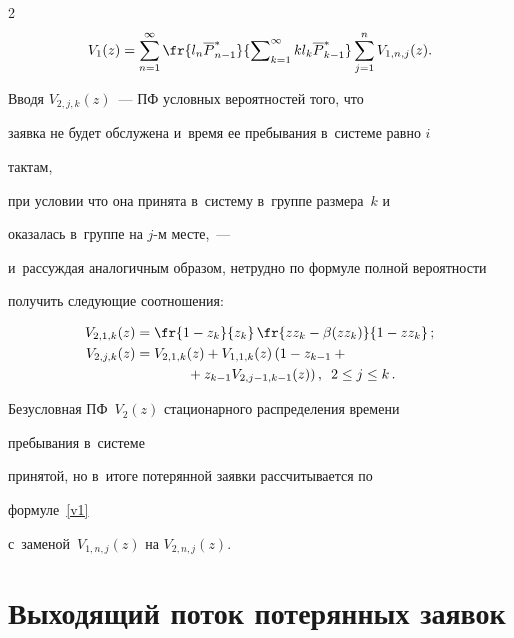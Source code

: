 \begin{multicols}{2}
\begin{equation}
V_1(z)=


\sum\limits_{n=1}^\infty \fr {l_n {\overline P}^*_{n-1} 


}{\sum\nolimits_{k=1}^\infty k l_k {\overline P}^*_{k-1} }


\sum\limits_{j=1}^n V_{1,n,j}(z).


\end{equation}





\noindent 


Вводя $V_{2,j,k}(z)$~--- ПФ условных вероятностей того, что


заявка не будет обслужена и~время ее пребывания в~системе равно $i$ 


тактам,


при условии что она принята в~систему в~группе размера~$k$ и


оказалась в~группе на $j$-м месте,~--- 


и~рассуждая аналогичным образом, нетрудно по формуле полной вероятности


получить следующие соотношения:


\begin{align*}


V_{2,1,k}(z)&=\fr{1-z_k}{z_k}\,\fr { z z_k - \beta(z z_k)}{1- z z_k}\,;\\


V_{2,j,k}(z)&=V_{2,1,k}(z)+V_{1,1,k}(z)


\left(1-z_{k-1} +{}\right.\\


&\hspace*{12mm}\left.{}+ z_{k-1} V_{2,j-1,k-1}(z)\right), \enskip 2 \le j \le k\,.


\end{align*}





\noindent Безусловная ПФ~$V_2(z)$ стационарного распределения времени 


пребывания в~системе


принятой, но в~итоге потерянной заявки рассчитывается по 


формуле~\eqref{v1}


с~заменой~$V_{1,n,j}(z)$ на $V_{2,n,j}(z)$.








\section{Выходящий поток потерянных заявок}






\end{multicols}
